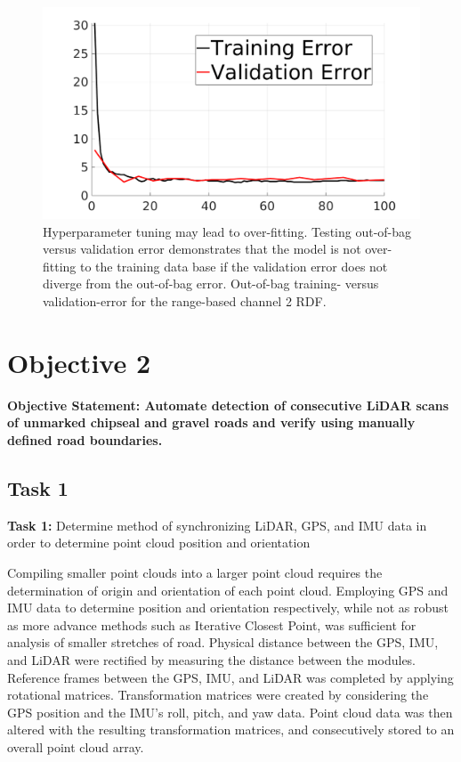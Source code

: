 \documentclass[numbered,pdftex]{ohio-etd}
\begin{document}
{{{{				\begin{figure}[H]
					\centering
					\includegraphics[width=0.75\linewidth]{Defense_Images/train_vs_valid_overfit_test2}
					\caption[Training vs Validation Error]{Hyperparameter tuning may lead to over-fitting. Testing out-of-bag versus validation error demonstrates that the model is not over-fitting to the training data base if the validation error does not diverge from the out-of-bag error. Out-of-bag training- versus validation-error for the range-based channel 2 RDF.}
					\label{fig:train_vs_valid_overfit_test2}
				\end{figure}
					


			} %
			
				
		} %

	} %


\newpage
	
	\section{Objective 2}\label{sec:objective-2}
	
		{
		
		\textbf{Objective Statement: Automate detection of consecutive LiDAR scans of unmarked chipseal and gravel roads and verify using manually defined road boundaries.}
		
		\subsection{Task 1}{
		
			\textbf{Task 1: }{Determine method of synchronizing LiDAR, GPS, and IMU data in order to determine point cloud position and orientation}
		
				{Compiling smaller point clouds into a larger point cloud requires the determination of origin and orientation of each point cloud. Employing GPS and IMU data to determine position and orientation respectively, while not as robust as more advance methods such as Iterative Closest Point, was sufficient for analysis of smaller stretches of road. Physical distance between the GPS, IMU, and LiDAR were rectified by measuring the distance between the modules. Reference frames between the GPS, IMU, and LiDAR was completed by applying rotational matrices. Transformation matrices were created by considering the GPS position and the IMU's roll, pitch, and yaw data. Point cloud data was then altered with the resulting transformation matrices, and consecutively stored to an overall point cloud array.}
			
}}}
\end{document}
